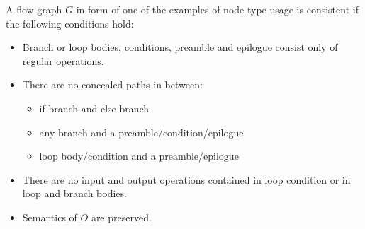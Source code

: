   A flow graph $G$ in form of one of the examples of node type usage is consistent if the following conditions hold:
  \begin{itemize}
    \item Branch or loop bodies, conditions, preamble and epilogue consist only of regular operations. 
    \item There are no concealed paths in between:
      \begin{itemize}
        \item if branch and else branch
        \item any branch and a preamble/condition/epilogue
        \item loop body/condition and a preamble/epilogue
      \end{itemize}
    \item There are no input and output operations contained in loop condition or in loop and branch bodies.
    \item Semantics of $O$ are preserved.
    \end{itemize}
